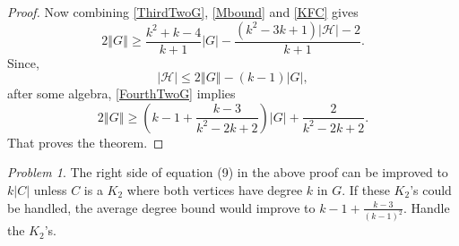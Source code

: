 \documentclass[12pt]{article}
\theoremstyle{plain}
\theoremstyle{definition}
\theoremstyle{remark}
\newtheorem*{problem}{Problem}
\newcommand{\fancy}[1]{\mathcal{#1}}
\newcommand{\HH}{\fancy{H}}
\newcommand{\card}[1]{\left|#1\right|}
\newcommand{\size}[1]{\left\Vert#1\right\Vert}
\newcommand{\parens}[1]{\left( #1 \right)}
\begin{document}
\begin{proof}
			Now combining \ref{ThirdTwoG}, \ref{Mbound} and \ref{KFC} gives 
			\begin{equation}
			2\size{G} \ge \frac{k^2 + k -4}{k+1}\card{G} - \frac{(k^2 - 3k + 1)\card{\HH} - 2}{k+1}.
			\label{FourthTwoG}
			\end{equation}
			Since,
			\begin{equation*}
			  \card{\HH} \le 2\size{G} - (k-1)\card{G},
			\end{equation*}
			after some algebra, \ref{FourthTwoG} implies
			\begin{equation*}
				2\size{G} \ge \parens{k-1 + \frac{k-3}{k^2 -2k + 2}}\card{G} + \frac{2}{k^2 -2k + 2}.
			\end{equation*}
			That proves the theorem.
\end{proof}

\begin{problem}
The right side of equation (9) in the above proof can be improved to $k\card{C}$ unless $C$ is a $K_2$ where both vertices have degree $k$ in $G$.  If these $K_2$'s could be handled, the average degree bound would improve to $k-1 + \frac{k-3}{(k-1)^2}$.  Handle the $K_2$'s.
\end{problem}



\end{document}

